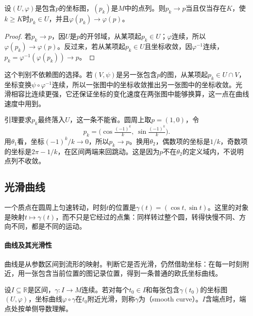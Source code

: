 \begin{lemma}[点列收敛的坐标判别]
\label{lem:mfd-sequence-convergence}
设$(U,\varphi)$是包含$p$的坐标图，$(p_k)$是$M$中的点列。则$p_k\to p$当且仅当存在$K$，使$k\geq K$时$p_k\in U$，并且$\varphi(p_k)\to\varphi(p)$。
\end{lemma}

\begin{proof}
若$p_k\to p$，因$U$是$p$的开邻域，从某项起$p_k\in U$；$\varphi$连续，所以$\varphi(p_k)\to\varphi(p)$。反过来，若从某项起$p_k\in U$且坐标收敛，因$\varphi^{-1}$连续，$p_k=\varphi^{-1}(\varphi(p_k))\to p$。
\end{proof}

这个判别不依赖图的选择。若$(V,\psi)$是另一张包含$p$的图，从某项起$p_k\in U\cap V$，坐标变换$\psi\circ\varphi^{-1}$连续，所以一张图中的坐标收敛推出另一张图中的坐标收敛。光滑相容比连续更强，它还保证坐标的变化速度在两张图中能够换算，这一点在曲线速度中用到。

引理要求$p_k$最终落入$U$，这一条不能省。圆周上取$p=(1,0)$，令
\[
p_k=\bigl(\cos\tfrac{(-1)^k}{k},\ \sin\tfrac{(-1)^k}{k}\bigr).
\]
用$\theta_1$看，坐标$(-1)^k/k\to0$，所以$p_k\to p$。换用$\theta_2$，偶数项的坐标是$1/k$，奇数项的坐标是$2\pi-1/k$，在区间两端来回跳动。这是因为$p$不在$\theta_2$的定义域内，不说明点列不收敛。

\subsection{光滑曲线}
\label{sec:mfd-smooth-curves}

一个质点在圆周上匀速转动，时刻$t$的位置是$\gamma(t)=(\cos t,\sin t)$。这里的对象是映射$t\mapsto\gamma(t)$，而不只是它经过的点集：同样转过整个圆，转得快慢不同、方向不同，都是不同的运动。

\paragraph{曲线及其光滑性}
曲线是从参数区间到流形的映射。判断它是否光滑，仍然借助坐标：在每一时刻附近，用一张包含当前位置的图记录位置，得到一条普通的欧氏坐标曲线。

\begin{definition}[光滑曲线]
\label{def:mfd-smooth-curve}
设$I\subseteq\mathbb R$是区间，$\gamma:I\to M$连续。若对每个$t_0\in I$和每张包含$\gamma(t_0)$的坐标图$(U,\varphi)$，坐标曲线$\varphi\circ\gamma$在$t_0$附近光滑，则称$\gamma$为（smooth curve）。$I$含端点时，端点处按单侧导数理解。
\end{definition}

